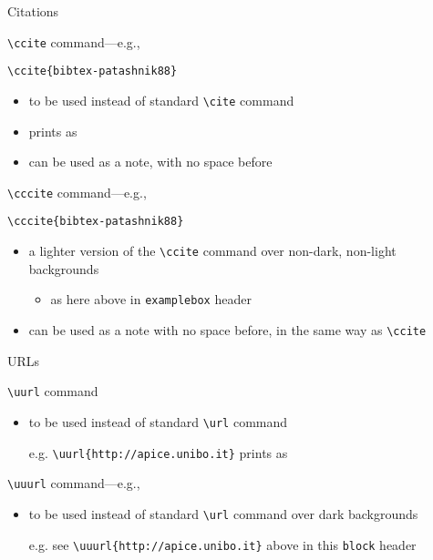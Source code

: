 \documentclass[presentation,apice]{beamer}\mode<presentation>{\usetheme{AMSBolognaFC}}
\begin{document}
\begin{frame}{Citations}
%
\begin{alertblock}{\texttt{\textbackslash{}ccite} command---e.g., }
\begin{verbatim}
\ccite{bibtex-patashnik88}
\end{verbatim}
\begin{itemize}
	\item to be used instead of standard \texttt{\textbackslash{}cite} command
	\item prints as 
	\item can be used as a note, with no space before
\end{itemize}
\end{alertblock}
%
\begin{exampleblock}{\texttt{\textbackslash{}cccite} command---e.g., }
\begin{verbatim}
\cccite{bibtex-patashnik88}
\end{verbatim}
\begin{itemize}
	\item a lighter version of the \texttt{\textbackslash{}ccite} command over non-dark, non-light backgrounds
	\begin{itemize}
		\item as here above in \texttt{examplebox} header
	\end{itemize}
	\item can be used as a note with no space before, in the same way as \texttt{\textbackslash{}ccite}
\end{itemize}
\end{exampleblock}
%
\end{frame}

\begin{frame}[c,fragile]{URLs}
%
\begin{block}{\texttt{\textbackslash{}uurl} command}
\begin{itemize}
	\item to be used instead of standard \texttt{\textbackslash{}url} command
	\item[e.g.] \verb|| prints as \uurl{http://apice.unibo.it}
\end{itemize}
\end{block}
%
\begin{block}{\texttt{\textbackslash{}uuurl} command---e.g., }
\begin{itemize}
	\item to be used instead of standard \texttt{\textbackslash{}url} command over dark backgrounds
	\item[e.g.] see \verb|\uuurl{http://apice.unibo.it}| above in this \texttt{block} header
\end{itemize}
\end{block}
%
\end{frame}
\end{document}
